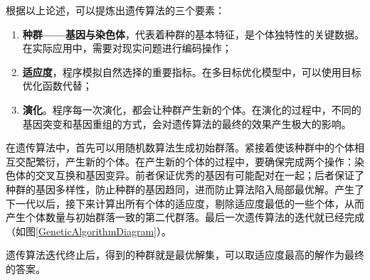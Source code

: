 根据以上论述，可以提炼出遗传算法的三个要素：

\begin{enumerate}
    \item \textbf{种群——基因与染色体}，代表着种群的基本特征，是个体独特性的关键数据。在实际应用中，需要对现实问题进行编码操作；
    \item \textbf{适应度}，程序模拟自然选择的重要指标。在多目标优化模型中，可以使用目标优化函数代替；
    \item \textbf{演化}。程序每一次演化，都会让种群产生新的个体。在演化的过程中，不同的基因突变和基因重组的方式，会对遗传算法的最终的效果产生极大的影响。
\end{enumerate}

在遗传算法中，首先可以用随机数算法生成初始群落。紧接着使该种群中的个体相互交配繁衍，产生新的个体。在产生新的个体的过程中，要确保完成两个操作：染色体的交叉互换和基因变异。前者保证优秀的基因有可能配对在一起；后者保证了种群的基因多样性，防止种群的基因趋同，进而防止算法陷入局部最优解。产生了下一代以后，接下来计算出所有个体的适应度，剔除适应度最低的一些个体，从而产生个体数量与初始群落一致的第二代群落。最后一次遗传算法的迭代就已经完成（如图\ref{GeneticAlgorithmDiagram}）。

遗传算法迭代终止后，得到的种群就是最优解集，可以取适应度最高的解作为最终的答案。


